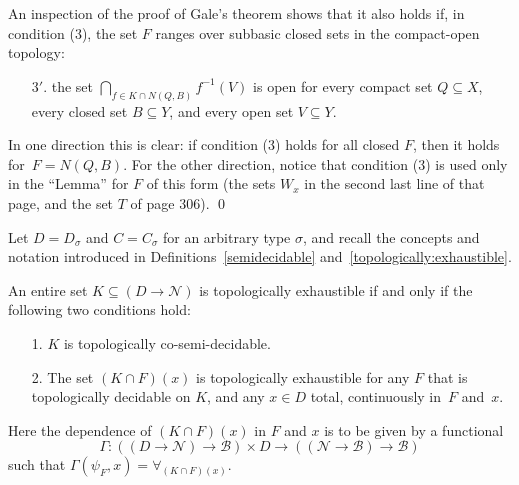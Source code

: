 \documentclass{LMCS}
\newcommand{\pN}{\mathcal{N}}
\newcommand{\pBool}{\mathcal{B}}
\begin{document}
\begin{rem} \label{F:specialcase} An inspection of the proof of Gale's
  theorem shows that it also holds if, in condition (3), the set $F$
  ranges over subbasic closed sets in the compact-open topology:
\begin{enumerate}
\item[$3'$.] the set $\bigcap_{f \in K \cap N(Q,B)} f^{-1}(V)$ is open
  for every compact set $Q \subseteq X$, every closed set $B \subseteq
  Y$, and every open set $V \subseteq Y$.
\end{enumerate}
In one direction this is clear: if condition (3) holds for all closed
$F$, then it holds for~$F=N(Q,B)$. For the other direction, notice
that condition (3) is used only in the ``Lemma'' \cite[page 305]{gale}
for $F$ of this form (the sets $W_x$ in the second last line of that
page, and the set $T$ of page 306). \qed
\end{rem}
Let $D=D_{\sigma}$ and $C = C_{\sigma}$ for an arbitrary type
$\sigma$, and recall the concepts and notation introduced in
Definitions~\ref{semidecidable} and~\ref{topologically:exhaustible}.
\pagebreak[3]
\begin{thm} \label{exhaustible:arzela:topological} An entire set
  $K \subseteq (D \to \pN)$ is topologically exhaustible if and only
  if the following two conditions hold:
\pagebreak[3]
  \begin{enumerate}
  \item[1.] $K$ is topologically co-semi-decidable. 
  \item[2.] The set $(K \cap F)(x)$ is topologically exhaustible for
    any $F$ that is topologically decidable on $K$, and any $x \in D$
    total, continuously in~$F$ and~$x$.
  \end{enumerate}
\end{thm}
Here the dependence of $(K \cap F)(x)$ in $F$ and $x$ is
to be given by a functional
\[
\Gamma \colon ((D \to \pN) \to \pBool) \times D \to ((\pN \to \pBool)
\to \pBool)
\]
such that
$\Gamma(\psi_F,x) = \forall_{(K\cap F)(x)}.$
\end{document}
